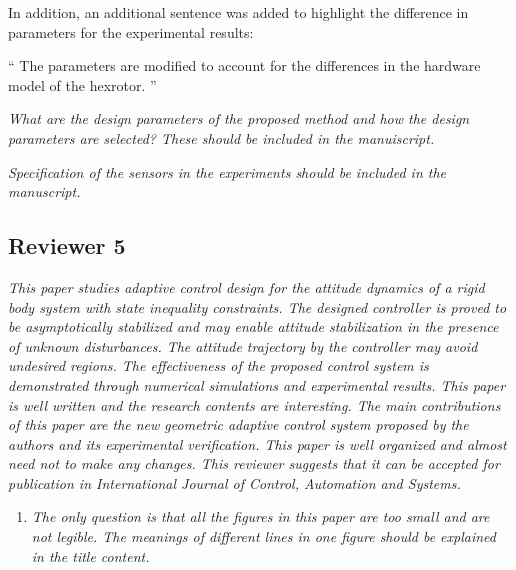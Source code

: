 \documentclass[11pt]{article}
\newenvironment{correction}{\begin{list}{}{\setlength{\leftmargin}{1cm}\setlength{\rightmargin}{1cm}}\vspace{\parsep}\item[]``}{''\end{list}}
\begin{document}
\begin{enumerate}
In addition, an additional sentence was added to highlight the difference in parameters for the experimental results:
\begin{correction}
    The parameters are modified to account for the differences in the hardware model of the hexrotor.
\end{correction}

\item \textit{What are the design parameters of the proposed method and how the design parameters are selected? These should be included in the manuiscript.}
\item \textit{Specification of the sensors in the experiments should be included in the manuscript.}
\end{enumerate}

\subsection*{Reviewer 5}
\textit{This paper studies adaptive control design for the attitude dynamics of a rigid body system with state inequality constraints. The designed controller is proved to be asymptotically stabilized and may enable attitude stabilization in the presence of unknown disturbances. The attitude trajectory by the controller may avoid undesired regions. The effectiveness of the proposed control system is demonstrated through numerical simulations and experimental results. This paper is well written and the research contents are interesting. The main contributions of this paper are the new geometric adaptive control system proposed by the authors and its experimental verification. This paper is well organized and almost need not to make any changes. This reviewer suggests that it can be accepted for publication in International Journal of Control, Automation and Systems.}

\begin{enumerate}
\item \textit{The only question is that all the figures in this paper are too small and are not legible. The meanings of different lines in one figure should be explained in the title content.}
\end{enumerate}



\end{document}
